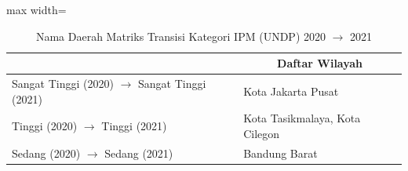 \begin{table}[H]
\centering
\caption{Nama Daerah Matriks Transisi Kategori IPM (UNDP) 2020 \(\rightarrow\) 2021} \label{tab:sample1ipmname2020x2021}
\begin{adjustbox}{max width=\textwidth}
\begin{tabular}{|>{\centering\arraybackslash}p{4cm}|p{10cm}|}
\hline
\multicolumn{1}{|c|}{\textbf{Kategori}} & \multicolumn{1}{c|}{\textbf{Daftar Wilayah}} \\
\hline
Sangat Tinggi (2020) \(\rightarrow\) Sangat Tinggi (2021) & Kota Jakarta Pusat \\
\hline
Tinggi (2020) \(\rightarrow\) Tinggi (2021) & Kota Tasikmalaya, Kota Cilegon \\
\hline
Sedang (2020) \(\rightarrow\) Sedang (2021) & Bandung Barat \\
\hline
\end{tabular}
\end{adjustbox}
\end{table}